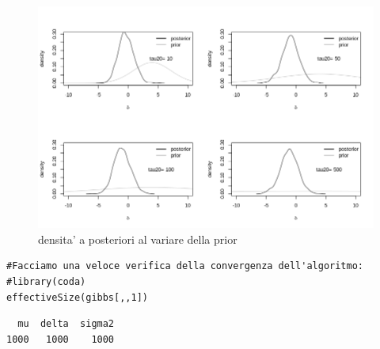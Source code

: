 \begin{itemize}[-]
\begin{figure}
 \centering
 \includegraphics[scale=0.7]{img/esercizio8-2-3}
 \caption{densita' a posteriori al variare della prior}
 \label{figure:figura14}
\end{figure}

\begin{lstlisting}[style=R]
#Facciamo una veloce verifica della convergenza dell'algoritmo:
#library(coda)
effectiveSize(gibbs[,,1])
\end{lstlisting}

{
\color{red}
\begin{Verbatim}
  mu  delta  sigma2
1000   1000    1000
\end{Verbatim}
}

\end{itemize}

